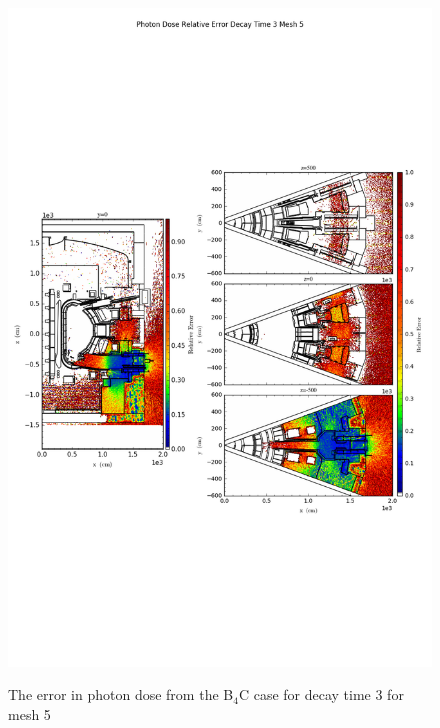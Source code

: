\begin{figure}[ht!]
\centering
\includegraphics[trim={0cm 9cm 0cm 10cm},clip,scale=0.75]{../plots/final_model_with_b4c/Photon_Dose_Relative_Error_Decay_Time_3_Mesh_5.png}
\label{fig:photons_dc3_no4bc_m5_error}
\caption{The error in photon dose from the B$_4$C case for decay time 3 for mesh 5}
\end{figure}
